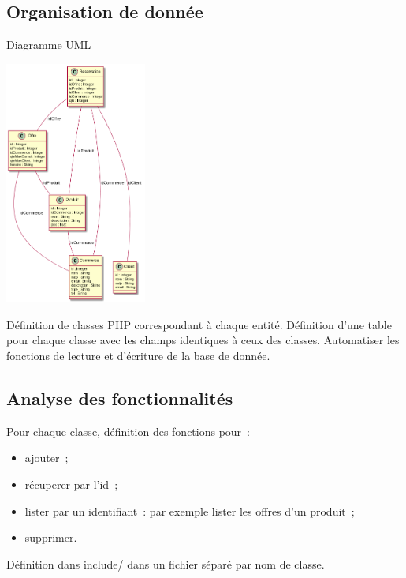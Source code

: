 \documentclass{beamer}
\begin{document}
\subsection{Organisation de donnée}

\begin{frame}{Diagramme UML}
	\begin{center}
		\includegraphics[height=8cm]{uml.png}
	\end{center}
\end{frame}

\begin{frame}
	Définition de classes PHP correspondant à chaque entité.
	\bigbreak
	Définition d'une table pour chaque classe avec les champs identiques à ceux des classes.
	\bigbreak
	Automatiser les fonctions de lecture et d'écriture de la base de donnée.
\end{frame}

\subsection{Analyse des fonctionnalités}

\begin{frame}
	Pour chaque classe, définition des fonctions pour~:
	\begin{itemize}
		\item ajouter~;
		\item récuperer par l'id~;
		\item lister par un identifiant~: par exemple lister les offres d'un produit~;
		\item supprimer.
	\end{itemize}

	Définition dans include/ dans un fichier séparé par nom de classe.

\end{frame}
\end{document}
